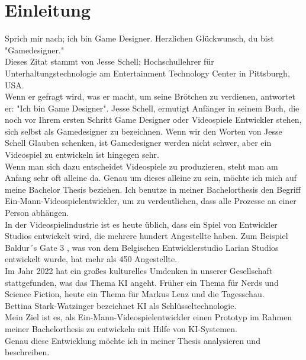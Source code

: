 \documentclass[12pt,a4paper,bibliography=totocnumbered,listof=totocnumbered]{scrartcl}
\begin{document}
\section{Einleitung} 
Sprich mir nach; ich bin Game Designer. Herzlichen Glückwunsch, du bist "Gamedesigner."
\\
Dieses Zitat stammt von Jesse Schell; Hochschullehrer für Unterhaltungstechnologie am Entertainment Technology Center in Pittsburgh, USA.
\\
Wenn er gefragt wird, was er macht, um seine Brötchen zu verdienen, antwortet er: "Ich bin Game Designer". Jesse Schell, ermutigt Anfänger in seinem Buch, die noch vor Ihrem ersten Schritt Game Designer oder Videospiele Entwickler stehen, sich selbst als Gamedesigner zu bezeichnen. Wenn wir den Worten von Jesse Schell Glauben schenken, ist Gamedesigner werden nicht schwer, aber ein Videospiel zu entwickeln ist hingegen sehr. 
\\
Wenn man sich dazu entscheidet Videospiele zu produzieren, steht man am Anfang sehr oft alleine da. Genau um dieses alleine zu sein, möchte ich mich auf meine Bachelor Thesis beziehen. Ich benutze in meiner Bachelorthesis den Begriff Ein-Mann-Videospielentwickler, um zu verdeutlichen, dass alle Prozesse an einer Person abhängen. 
\\
In der Videospielindustrie ist es heute üblich, dass ein Spiel von Entwickler Studios entwickelt wird, die mehrere hundert Angestellte haben. Zum Beispiel Baldur´s Gate 3 , was von dem Belgischen Entwicklerstudio Larian Studios entwickelt wurde, hat mehr als 450 Angestellte.
\\
Im Jahr 2022 hat ein großes kulturelles Umdenken in unserer Gesellschaft stattgefunden, was das Thema KI angeht. Früher ein Thema für Nerds und Science Fiction, heute ein Thema für Markus Lenz und die Tagesschau.
\\
Bettina Stark-Watzinger bezeichnet KI als Schlüsseltechnologie.
\\
Mein Ziel ist es, als Ein-Mann-Videospielentwickler einen Prototyp im Rahmen meiner Bachelorthesis zu entwickeln mit Hilfe von KI-Systemen.
\\
Genau diese Entwicklung möchte ich in meiner Thesis analysieren und beschreiben.
\end{document}
